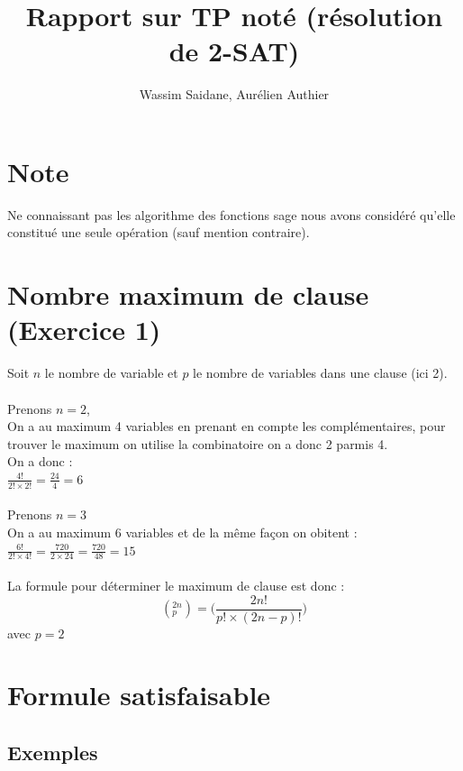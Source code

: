 \documentclass{article}
\title{Rapport sur TP noté (résolution de 2-SAT)}
\author{Wassim Saidane, Aurélien Authier}
\date{}
\begin{document}
    \lstset{language=python}
    \maketitle
    \tableofcontents
    \newpage
    \section*{Note}
    Ne connaissant pas les algorithme des fonctions sage nous avons considéré qu'elle constitué une seule opération (sauf mention contraire).
    \section{Nombre maximum de clause (Exercice 1)}
    Soit $n$ le nombre de variable et $p$ le nombre de variables dans une clause (ici 2). \\
    \\
    Prenons $n=2$, \\
    On a au maximum 4 variables en prenant en compte les complémentaires, pour trouver le maximum on utilise la combinatoire on a donc 2 parmis 4.\\
    On a donc : \\
    $\frac{4!}{2! \times 2!}=\frac{24}{4}=6$ \\
    \\
    Prenons $n=3$ \\
    On a au maximum 6 variables et de la même façon on obitent : \\
    $\frac{6!}{2! \times 4!}=\frac{720}{2 \times 24}=\frac{720}{48}=15$ \\
    \\
    La formule pour déterminer le maximum de clause est donc : 
    \begin{equation*}
        (^{2n}_p)=\biggl(\frac{2n!}{p! \times (2n-p)!}\biggr)
    \end{equation*}
    avec $p=2$
    \section{Formule satisfaisable}
    \subsection{Exemples}
\end{document}
